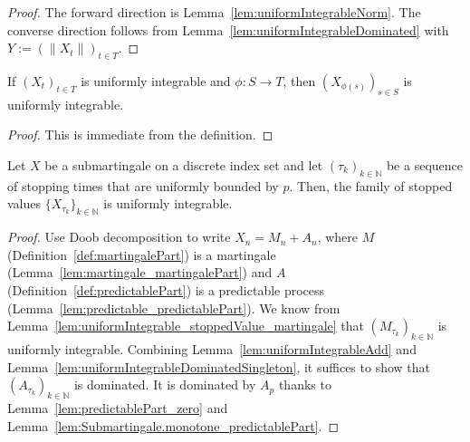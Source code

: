 \begin{proof}
  \leanok
The forward direction is Lemma~\ref{lem:uniformIntegrableNorm}. The converse direction follows from Lemma~\ref{lem:uniformIntegrableDominated} with $Y := (\|X_t\|)_{t \in T}$.
\end{proof}

\begin{lemma}\label{lem:uniformIntegrableComp}
  \leanok
If $(X_t)_{t \in T}$ is uniformly integrable and $\phi : S \to T$, then $(X_{\phi(s)})_{s \in S}$ is uniformly integrable.
\end{lemma}

\begin{proof}\leanok
This is immediate from the definition.
\end{proof}

\begin{lemma}\label{lem:uniformIntegrable_stoppedValue_submartingale}
  \leanok
Let $X$ be a submartingale on a discrete index set and let $(\tau_k)_{k \in \mathbb{N}}$ be a sequence of stopping times that are uniformly bounded by $p$.
Then, the family of stopped values $\{X_{\tau_k}\}_{k \in \mathbb{N}}$ is uniformly integrable.
\end{lemma}

\begin{proof}
Use Doob decomposition to write $X_n = M_n + A_n$, where $M$ (Definition~\ref{def:martingalePart}) is a martingale (Lemma~\ref{lem:martingale_martingalePart}) and $A$ (Definition~\ref{def:predictablePart}) is a predictable process (Lemma~\ref{lem:predictable_predictablePart}).
We know from Lemma~\ref{lem:uniformIntegrable_stoppedValue_martingale} that $(M_{\tau_k})_{k \in \mathbb{N}}$ is uniformly integrable. Combining Lemma~\ref{lem:uniformIntegrableAdd} and Lemma~\ref{lem:uniformIntegrableDominatedSingleton}, it suffices to show that $(A_{\tau_k})_{k \in \mathbb{N}}$ is dominated. It is dominated by $A_p$ thanks to Lemma~\ref{lem:predictablePart_zero} and Lemma~\ref{lem:Submartingale.monotone_predictablePart}.
\end{proof}

